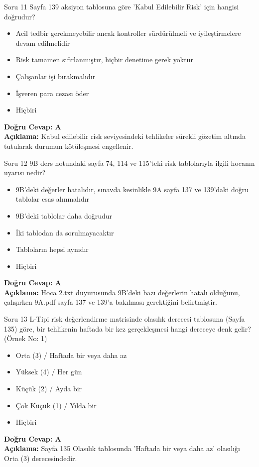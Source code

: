 \documentclass[12pt,a4paper]{article}
\begin{document}
\begin{testcard}{Soru 11}
    Sayfa 139 aksiyon tablosuna göre 'Kabul Edilebilir Risk' için hangisi doğrudur?
    \begin{itemize}
        \item[A)] Acil tedbir gerekmeyebilir ancak kontroller sürdürülmeli ve iyileştirmelere devam edilmelidir
        \item[B)] Risk tamamen sıfırlanmıştır, hiçbir denetime gerek yoktur
        \item[C)] Çalışanlar işi bırakmalıdır
        \item[D)] İşveren para cezası öder
        \item[E)] Hiçbiri
    \end{itemize}
    \tcblower
    \textbf{Doğru Cevap: A} \\
    \textbf{Açıklama:} Kabul edilebilir risk seviyesindeki tehlikeler sürekli gözetim altında tutularak durumun kötüleşmesi engellenir.
\end{testcard}

\begin{testcard}{Soru 12}
    9B ders notundaki sayfa 74, 114 ve 115'teki risk tablolarıyla ilgili hocanın uyarısı nedir?
    \begin{itemize}
        \item[A)] 9B'deki değerler hatalıdır, sınavda kesinlikle 9A sayfa 137 ve 139'daki doğru tablolar esas alınmalıdır
        \item[B)] 9B'deki tablolar daha doğrudur
        \item[C)] İki tablodan da sorulmayacaktır
        \item[D)] Tabloların hepsi aynıdır
        \item[E)] Hiçbiri
    \end{itemize}
    \tcblower
    \textbf{Doğru Cevap: A} \\
    \textbf{Açıklama:} Hoca 2.txt duyurusunda 9B'deki bazı değerlerin hatalı olduğunu, çalışırken 9A.pdf sayfa 137 ve 139'a bakılması gerektiğini belirtmiştir.
\end{testcard}

\begin{testcard}{Soru 13}
    L-Tipi risk değerlendirme matrisinde olasılık derecesi tablosuna (Sayfa 135) göre, bir tehlikenin haftada bir kez gerçekleşmesi hangi dereceye denk gelir? (Örnek No: 1)
    \begin{itemize}
        \item[A)] Orta (3) / Haftada bir veya daha az
        \item[B)] Yüksek (4) / Her gün
        \item[C)] Küçük (2) / Ayda bir
        \item[D)] Çok Küçük (1) / Yılda bir
        \item[E)] Hiçbiri
    \end{itemize}
    \tcblower
    \textbf{Doğru Cevap: A} \\
    \textbf{Açıklama:} Sayfa 135 Olasılık tablosunda 'Haftada bir veya daha az' olasılığı Orta (3) derecesindedir.
\end{testcard}
\end{document}
